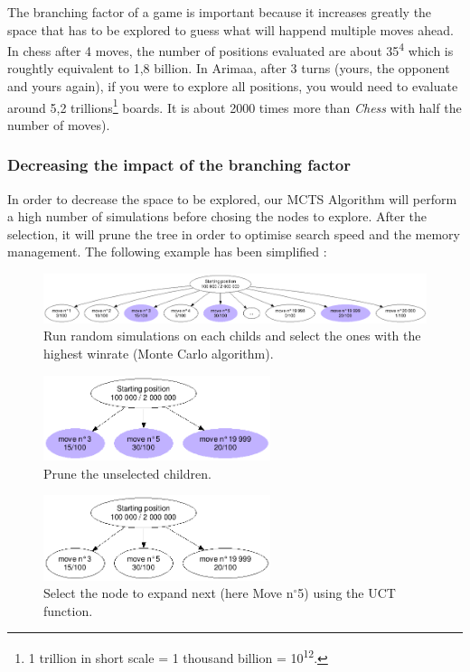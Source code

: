 The branching factor of a game is important because it increases greatly the space that has to be explored to guess what will happend multiple moves ahead. In chess after 4 moves, the number of positions evaluated are about 35\textsuperscript{4} which is roughtly equivalent to 1,8 billion. In Arimaa, after 3 turns (yours, the opponent and yours again), if you were to explore all positions, you would need to evaluate around 5,2 trillions\footnote{1 trillion in short scale = 1 thousand billion = 10\textsuperscript{12}.} boards. It is about 2000 times more than \textit{Chess} with half the number of moves).

\subsubsection{Decreasing the impact of the branching factor}

In order to decrease the space to be explored, our MCTS Algorithm will perform a high number of simulations before chosing the nodes to explore. After the selection, it will prune the tree in order to optimise search speed and the memory management. The following example has been simplified :
\begin{figure}[H]
\centering
	\includegraphics[width=\textwidth]{3Methods/3.2MCTS/img/root.png}
	\caption{\label{fig:roottree}Run random simulations on each childs and select the ones with the highest winrate (Monte Carlo algorithm).}
\end{figure}

\begin{figure}[H]
\centering
	\includegraphics[height=2.5cm]{3Methods/3.2MCTS/img/prune.png}
	\caption{\label{fig:prune}Prune the unselected children.}
\end{figure}

\begin{figure}[H]
\centering
	\includegraphics[height=2.5cm]{3Methods/3.2MCTS/img/prune-clean.png}
	\caption{\label{fig:prune-clean}Select the node to expand next (here Move n$^{\circ}$5) using the UCT function.}
\end{figure}

